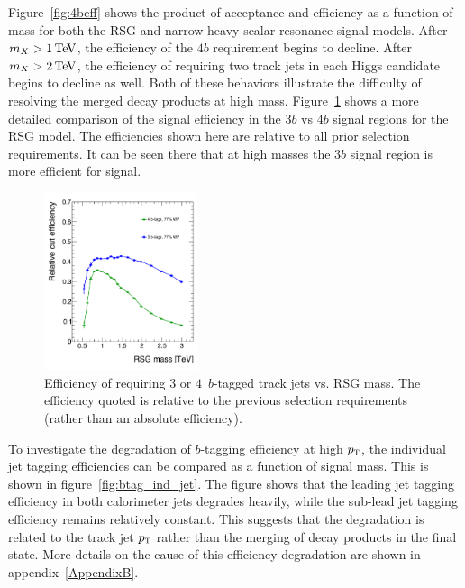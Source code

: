 Figure~\ref{fig:4beff} shows the product of acceptance and efficiency as a function of mass for both the RSG and narrow heavy scalar resonance signal models. After $m_{X} > 1 \TeV$, the efficiency of the $4b$ requirement begins to decline. After $m_{X} > 2 \TeV$, the efficiency of requiring two track jets in each Higgs candidate begins to decline as well. Both of these behaviors illustrate the difficulty of resolving the merged decay products at high mass. Figure~\ref{fig:3bvs4b} shows a more detailed comparison of the signal efficiency in the $3b$ vs $4b$ signal regions for the RSG model. The efficiencies shown here are relative to all prior selection requirements. It can be seen there that at high masses the $3b$ signal region is more efficient for signal. 

\begin{figure}[h!]
  \centering
  \captionsetup{justification=centering}

  \includegraphics[width=0.4\textwidth]{figures/3bvs4b_eff}
  \caption{Efficiency of requiring $3$ or $4\,$ $b$-tagged track jets vs. RSG mass. The efficiency quoted is relative to the previous selection requirements (rather than an absolute efficiency). }
  \label{fig:3bvs4b}
\end{figure}

To investigate the degradation of $b$-tagging efficiency at high $p_{\textrm{\footnotesize\sc t}}$, the individual jet tagging efficiencies can be compared as a function of signal mass. This is shown in figure~\ref{fig:btag_ind_jet}. The figure shows that the leading jet tagging efficiency in both calorimeter jets degrades heavily, while the sub-lead jet tagging efficiency remains relatively constant. This suggests that the degradation is related to the track jet $p_{\textrm{\footnotesize\sc t}}$ rather than the merging of decay products in the final state. More details on the cause of this efficiency degradation are shown in appendix~\ref{AppendixB}. 

